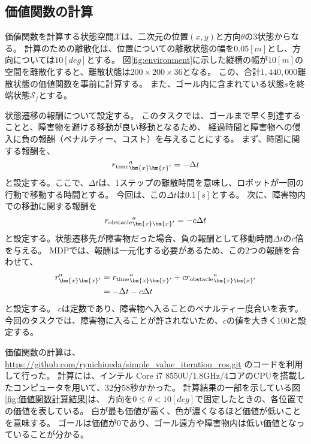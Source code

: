 \subsection{価値関数の計算}
価値関数を計算する状態空間$\mathcal{X}$は、二次元の位置$(x, y)$と方向$\theta$の3状態からなる。
計算のための離散化は、位置についての離散状態の幅を$0.05\si{[m]}$とし、方向については$10\si{[deg]}$とする。
図\ref{fig:environment}に示した縦横の幅が$10\si{[m]}$の空間を離散化すると、離散状態は$200 \times 200 \times 36$となる。
この、合計$1,440,000$離散状態の価値関数を事前に計算する。
また、ゴール内に含まれている状態$s$を終端状態$\mathcal{S}_f$とする。

状態遷移の報酬について設定する。
このタスクでは、ゴールまで早く到達することと、障害物を避ける移動が良い移動となるため、
経過時間と障害物への侵入に負の報酬（ペナルティー、コスト）を与えることにする。
まず、時間に関する報酬を、
\begin{equation}
\label{robot initial pose}
  {r_{\rm time}}^{a}_{\bm{x}\bm{x}^{\prime}} = -\Delta t
\end{equation}
と設定する。ここで、$\Delta t$は、$1$ステップの離散時間を意味し、ロボットが一回の行動で移動する時間とする。
今回は、この$\Delta t$は$0.1[s]$とする。
次に、障害物内での移動に関する報酬を
\begin{equation}
\label{robot initial pose}
  {r_{\rm obstacle}}^{a}_{\bm{x}\bm{x}^{\prime}} = -c\Delta t
\end{equation}
と設定する。状態遷移先が障害物だった場合、負の報酬として移動時間$\Delta t$の$c$倍を与える。
MDPでは、報酬は一元化する必要があるため、この2つの報酬を合わせて、
\begin{equation}
\label{robot initial pose}
\begin{split}
  r^{a}_{\bm{x}\bm{x}^{\prime}} &=
  {r_{\rm time}}^{a}_{\bm{x}\bm{x}^{\prime}} +
  c{r_{\rm obstacle}}^{a}_{\bm{x}\bm{x}^{\prime}} \\
  &= -\Delta t  -c\Delta t
\end{split}
\end{equation}
と設定する。
$c$は定数であり、障害物へ入ることのペナルティー度合いを表す。
今回のタスクでは、障害物に入ることが許されないため、$c$の値を大きく$100$と設定する。

価値関数の計算は、
\url{https://github.com/ryuichiueda/simple_value_iteration_ros.git}
のコードを利用して行った。
計算には、インテル Core i7 8550U/1.8GHz/4コアのCPUを搭載したコンピュータを用いて、32分58秒かかった。
計算結果の一部を示している図\ref{fig:価値関数計算結果}は、
方向を$0 \leq \theta < 10 \si{[deg]}$で固定したときの、各位置での価値を表している。
白が最も価値が高く、色が濃くなるほど価値が低いことを意味する。
ゴールは価値が$0$であり、ゴール遠方や障害物内は低い価値となっていることが分かる。

